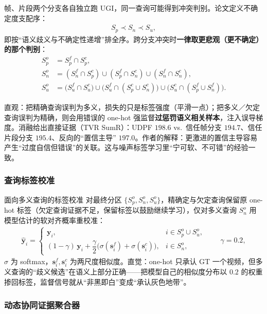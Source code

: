 \documentclass[11pt,a4paper,UTF8,fontset=windows]{ctexart}
\newcommand{\term}[1]{\textbf{#1}}
\newcommand{\vect}[1]{\boldsymbol{#1}}
\begin{document}
帧、片段两个分支各自独立跑 UGI，同一查询可能得到冲突判别。论文定义不确定度支配序：
\begin{align}
S_p \prec S_n \prec S_u ,
\end{align}
即按“语义歧义与不确定性递增”排全序。跨分支冲突时\term{一律取更悲观（更不确定）的那个判别}：
\begin{align}
S^o_p &= S^f_p \cap S^c_p,\\
S^o_n &= (S^f_n\cap S^c_p)\cup(S^f_p\cap S^c_n)\cup(S^f_n\cap S^c_n),\\
S^o_u &= \big(S^f_u\cap S^c_u\big)\cup\big(S^f_u\cap(S^c_p\cup S^c_n)\big)\cup\big(S^c_u\cap(S^f_p\cup S^f_n)\big).
\end{align}

\begin{thinkbox}
直观：把精确查询误判为多义，损失的只是标签强度（平滑一点）；把多义／欠定查询误判为精确，则会用错误的 one-hot 强监督\term{过惩罚语义相关样本}，注入误导梯度。消融给出直接证据（TVR SumR）：UDPF $198.6$ vs.\ 信任帧分支 $194.7$、信任片段分支 $195.4$、反向的“置信主导” $197.0$。作者的解释：更激进的置信主导容易产生“过度自信但错误”的关联。这与噪声标签学习里“宁可软、不可错”的经验一致。
\end{thinkbox}

\subsubsection{查询标签校准}

\begin{structbox}{面向多义查询的标签校准}
对最终分区 $\{S^o_p, S^o_n, S^o_u\}$，精确定与欠定查询保留原 one-hot 标签（欠定查询证据不足，保留标签以鼓励继续学习），仅对多义查询 $S^o_n$ 用模型估计的软对齐概率重校准：
\begin{align}
\hat{\vect y}_i =
\begin{cases}
\vect y_i, & i \in S^o_p \cup S^o_u,\\[2pt]
(1-\gamma)\,\vect y_i + \dfrac{\gamma}{2}\Big(\sigma(\vect s^f_i) + \sigma(\vect s^c_i)\Big), & i \in S^o_n,
\end{cases}\qquad \gamma = 0.2,
\end{align}
$\sigma$ 为 softmax，$\vect s^f_i,\vect s^c_i$ 为两尺度相似度。直觉：one-hot 只承认 GT 一个视频，但多义查询的“歧义候选”在语义上部分正确——把模型自己的相似度分布以 $0.2$ 的权重掺回标签，监督信号就从“非黑即白”变成“承认灰色地带”。
\end{structbox}

\subsubsection{动态协同证据聚合器}\label{sec:aggregator}
\end{document}
